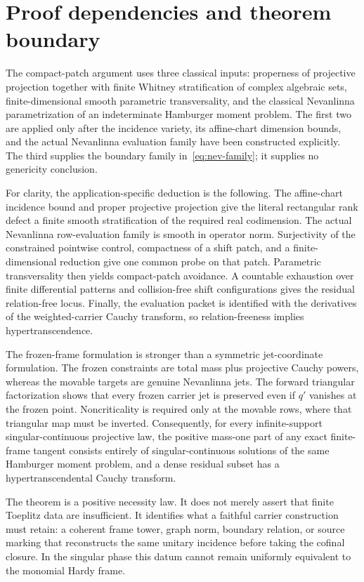 \documentclass[11pt]{article}
\begin{document}
\section{Proof dependencies and theorem boundary}\label{sec:dependencies}

The compact-patch argument uses three classical inputs: properness of projective projection
together with finite Whitney stratification of complex algebraic sets, finite-dimensional smooth
parametric transversality, and the classical Nevanlinna parametrization of an indeterminate
Hamburger moment problem.  The first two are applied only after the incidence variety, its
affine-chart dimension bounds, and the actual Nevanlinna evaluation family have been constructed
explicitly.  The third supplies the boundary family in~\eqref{eq:nev-family}; it supplies no
genericity conclusion.

For clarity, the application-specific deduction is the following.  The affine-chart incidence
bound and proper projective projection give the literal rectangular rank defect a finite smooth
stratification of the required real codimension.  The actual Nevanlinna row-evaluation family is
smooth in operator norm.  Surjectivity of the constrained pointwise control, compactness of a
shift patch, and a finite-dimensional reduction give one common probe on that patch.  Parametric
transversality then yields compact-patch avoidance.  A countable exhaustion over finite
differential patterns and collision-free shift configurations gives the residual relation-free
locus.  Finally, the evaluation packet is identified with the derivatives of the weighted-carrier
Cauchy transform, so relation-freeness implies hypertranscendence.

The frozen-frame formulation is stronger than a symmetric jet-coordinate formulation.  The
frozen constraints are total mass plus projective Cauchy powers, whereas the movable targets are
genuine Nevanlinna jets.  The forward triangular factorization shows that every frozen carrier jet
is preserved even if $q'$ vanishes at the frozen point.  Noncriticality is required only at the
movable rows, where that triangular map must be inverted.  Consequently, for every
infinite-support singular-continuous projective law, the positive mass-one part of any exact
finite-frame tangent consists entirely of singular-continuous solutions of the same Hamburger
moment problem, and a dense residual subset has a hypertranscendental Cauchy transform.

The theorem is a positive necessity law.  It does not merely assert that finite Toeplitz data are
insufficient.  It identifies what a faithful carrier construction must retain: a coherent frame
tower, graph norm, boundary relation, or source marking that reconstructs the same unitary
incidence before taking the cofinal closure.  In the singular phase this datum cannot remain
uniformly equivalent to the monomial Hardy frame.
\end{document}
